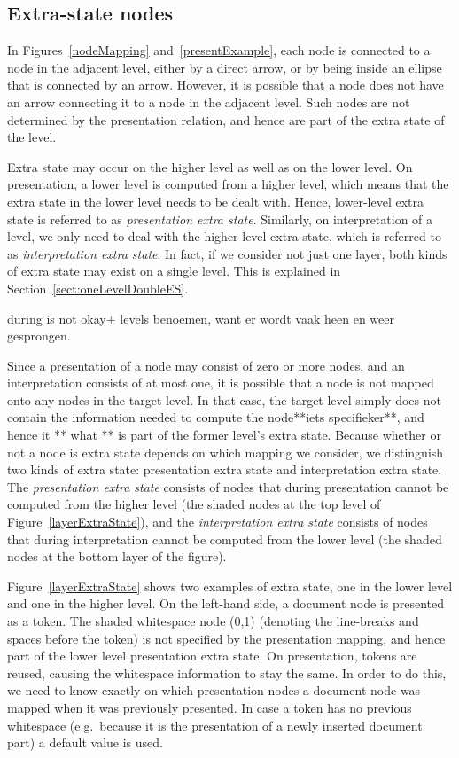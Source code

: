 %																
\subsection{Extra-state nodes}

In Figures~\ref{nodeMapping} and~\ref{presentExample}, each node is connected to a node in the adjacent level, either by a direct arrow, or by being inside an ellipse that is connected by an arrow. However, it is possible that a node does not have an arrow connecting it to a node in the adjacent level. Such nodes are not determined by the presentation relation, and hence are part of the extra state of the level.


Extra state may occur on the higher level as well as on the lower level. On presentation, a lower level is computed from a higher level, which means that the extra state in the lower level needs to be dealt with. Hence, lower-level extra state is referred to as {\em presentation extra state}. Similarly, on interpretation of a level, we only need to deal with the higher-level extra state, which is referred to as {\em interpretation extra state}. In fact, if we consider not just one layer, both kinds of extra state may exist on a single level. This is explained in Section~\ref{sect:oneLevelDoubleES}.

\bc
during is not okay+ levels benoemen, want er wordt vaak heen en weer gesprongen.

Since a presentation of a node may consist of zero or more nodes, and an interpretation consists of at most one, it is possible that a node is not mapped onto any nodes in the target level. In that case, the target level simply does not contain the information needed to compute the node**iets specifieker**, and hence it ** what ** is part of the former level's extra state. Because whether or not a node is extra state depends on which mapping we consider, we distinguish two kinds of extra state: presentation extra state and interpretation extra state. The {\em presentation extra state} consists of nodes that during presentation cannot be computed from the higher level (the shaded nodes at the top level of Figure~\ref{layerExtraState}), and the {\em interpretation extra state} consists of nodes that during interpretation cannot be computed from the lower level (the shaded nodes at the bottom layer of the figure).
\ec


Figure~\ref{layerExtraState} shows two examples of extra state, one in the lower level and one in the higher level. On the left-hand side, a document node is presented as a token. The shaded whitespace node (0,1) (denoting the line-breaks and spaces before the token) is not specified by the presentation mapping, and hence part of the lower level presentation extra state. On presentation, tokens are reused, causing the whitespace information to stay the same. In order to do this, we need to know exactly on which presentation nodes a document node was mapped when it was previously presented. In case a token has no previous whitespace (e.g.\ because it is the presentation of a newly inserted document part) a default value is used.

